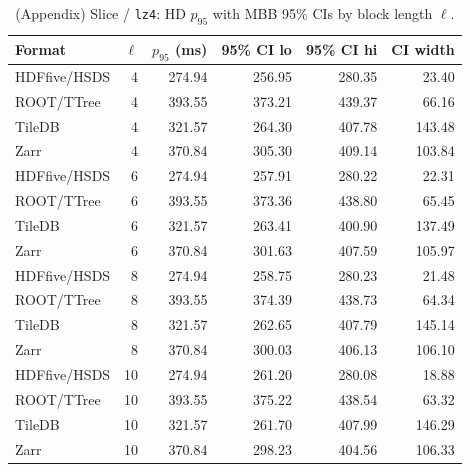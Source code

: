 \documentclass[nomenclature, english, bibtex]{kththesis}
\numberwithin{listing}{chapter}
\begin{document}
\begin{table}[H]
  \centering
  \caption*{(Appendix) Slice / \texttt{lz4}: \gls{HD} $p_{95}$ with \gls{MBB} 95\% \glspl{CI} by block length \(\ell\).}
  \begin{tabular}{l r r r r r}
    \toprule
    Format & \(\ell\) & $p_{95}$ (ms) & 95\% \gls{CI} lo & 95\% \gls{CI} hi & \gls{CI} width \\
    \midrule
    \gls{HDFfive}/\gls{HSDS} & 4  & 274.94 & 256.95 & 280.35 & 23.40 \\
    \gls{ROOT}/\gls{TTree} & 4  & 393.55 & 373.21 & 439.37 & 66.16 \\
    TileDB & 4 & 321.57 & 264.30 & 407.78 & 143.48 \\
    Zarr & 4  & 370.84 & 305.30 & 409.14 & 103.84 \\
    \gls{HDFfive}/\gls{HSDS} & 6  & 274.94 & 257.91 & 280.22 & 22.31 \\
    \gls{ROOT}/\gls{TTree} & 6  & 393.55 & 373.36 & 438.80 & 65.45 \\
    TileDB & 6 & 321.57 & 263.41 & 400.90 & 137.49 \\
    Zarr & 6  & 370.84 & 301.63 & 407.59 & 105.97 \\
    \gls{HDFfive}/\gls{HSDS} & 8  & 274.94 & 258.75 & 280.23 & 21.48 \\
    \gls{ROOT}/\gls{TTree} & 8  & 393.55 & 374.39 & 438.73 & 64.34 \\
    TileDB & 8 & 321.57 & 262.65 & 407.79 & 145.14 \\
    Zarr & 8  & 370.84 & 300.03 & 406.13 & 106.10 \\
    \gls{HDFfive}/\gls{HSDS} & 10 & 274.94 & 261.20 & 280.08 & 18.88 \\
    \gls{ROOT}/\gls{TTree} & 10 & 393.55 & 375.22 & 438.54 & 63.32 \\
    TileDB & 10& 321.57 & 261.70 & 407.99 & 146.29 \\
    Zarr & 10 & 370.84 & 298.23 & 404.56 & 106.33 \\
    \bottomrule
  \end{tabular}
\end{table}
\end{document}
